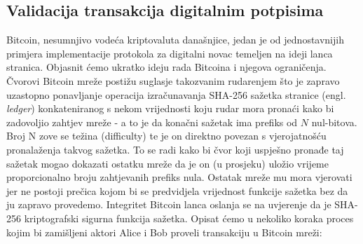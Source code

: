 \documentclass[utf8, zavrsni]{fer}
\begin{document}

\subsection{Validacija transakcija digitalnim potpisima}
Bitcoin, nesumnjivo vodeća kriptovaluta današnjice, jedan je od jednostavnijih primjera implementacije protokola za digitalni novac temeljen na ideji lanca stranica. Objasnit ćemo ukratko ideju rada Bitcoina i njegova ograničenja. Čvorovi Bitcoin mreže postižu suglasje takozvanim rudarenjem što je zapravo uzastopno ponavljanje operacija izračunavanja SHA-256 sažetka stranice (engl. \textit{ledger}) konkateniranog s nekom vrijednosti koju rudar mora pronaći kako bi zadovoljio zahtjev mreže - a to je da konačni sažetak ima prefiks od $N$ nul-bitova. Broj N zove se težina (difficulty) te je on direktno povezan s vjerojatnošću pronalaženja takvog sažetka. To se radi kako bi čvor koji uspješno pronađe taj sažetak mogao dokazati ostatku mreže da je on (u prosjeku) uložio vrijeme proporcionalno broju zahtjevanih prefiks nula. Ostatak mreže mu mora vjerovati jer ne postoji prečica kojom bi se predvidjela vrijednost funkcije sažetka bez da ju zapravo provedemo. Integritet Bitcoin lanca oslanja se na uvjerenje da je SHA-256 kriptografski sigurna funkcija sažetka. Opisat ćemo u nekoliko koraka proces kojim bi zamišljeni aktori Alice i Bob proveli transakciju u Bitcoin mreži:
\end{document}
